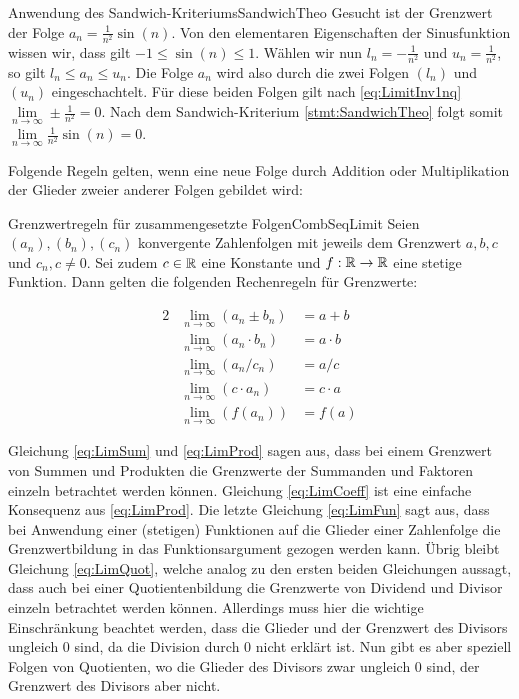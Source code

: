 \begin{example}{Anwendung des Sandwich-Kriteriums}{SandwichTheo}
	Gesucht ist der Grenzwert der Folge $a_n = \frac{1}{n^2}\sin(n)$. Von den elementaren Eigenschaften der Sinusfunktion wissen wir, dass gilt $-1\le\sin(n)\le 1$. Wählen wir nun $l_n = -\frac{1}{n^2}$ und $u_n = \frac{1}{n^2}$, so gilt $l_n \le a_n \le u_n$. Die Folge $a_n$ wird also durch die zwei Folgen $(l_n)$ und $(u_n)$ eingeschachtelt. Für diese beiden Folgen gilt nach \ref{eq:LimitInv1nq} $\lim\limits_{n\to\infty} \pm\frac{1}{n^2} = 0$. Nach dem Sandwich-Kriterium \ref{stmt:SandwichTheo} folgt somit $\lim\limits_{n\to\infty} \frac{1}{n^2}\sin(n) = 0$.
\end{example}

Folgende Regeln gelten, wenn eine neue Folge durch Addition oder Multiplikation der Glieder zweier anderer Folgen gebildet wird:

\begin{statement}{Grenzwertregeln für zusammengesetzte Folgen}{CombSeqLimit}
	Seien $(a_n), (b_n), (c_n)$ konvergente Zahlenfolgen mit jeweils dem Grenzwert $a, b, c$ und $c_n, c \ne 0$. Sei zudem $c \in \mathbb{R}$ eine Konstante und $f: \mathbb{R}\to\mathbb{R}$ eine stetige Funktion. Dann gelten die folgenden Rechenregeln für Grenzwerte:

	\begin{alignat}{2}
		& \lim\limits_{n\to\infty}(a_n \pm b_n) & = a + b \label{eq:LimSum} \\
		& \lim\limits_{n\to\infty}(a_n \cdot b_n) & = a \cdot b \label{eq:LimProd} \\
		& \lim\limits_{n\to\infty}(a_n / c_n) & = a / c \label{eq:LimQuot} \\
		& \lim\limits_{n\to\infty}(c \cdot a_n) & = c \cdot a \label{eq:LimCoeff} \\
		& \lim\limits_{n\to\infty}(f(a_n)) & = f(a)	\label{eq:LimFun}
	\end{alignat}
\end{statement}

Gleichung \ref{eq:LimSum} und \ref{eq:LimProd} sagen aus, dass bei einem Grenzwert von Summen und Produkten die Grenzwerte der Summanden und Faktoren einzeln betrachtet werden können. Gleichung \ref{eq:LimCoeff} ist eine einfache Konsequenz aus \ref{eq:LimProd}. Die letzte Gleichung \ref{eq:LimFun} sagt aus, dass bei Anwendung einer (stetigen) Funktionen auf die Glieder einer Zahlenfolge die Grenzwertbildung in das Funktionsargument gezogen werden kann.	Übrig bleibt Gleichung \ref{eq:LimQuot}, welche analog zu den ersten beiden Gleichungen aussagt, dass auch bei einer Quotientenbildung die Grenzwerte von Dividend und Divisor einzeln betrachtet werden können. Allerdings muss hier die wichtige Einschränkung beachtet werden, dass die Glieder und der Grenzwert des Divisors ungleich $0$ sind, da die Division durch $0$ nicht erklärt ist. Nun gibt es aber speziell Folgen von Quotienten, wo die Glieder des Divisors zwar ungleich $0$ sind, der Grenzwert des Divisors aber nicht.

